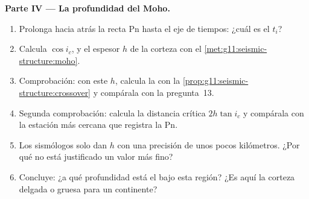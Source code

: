 \begin{problem}
\medskip
\noindent\textbf{Parte IV --- La profundidad del Moho.}
\begin{enumerate}[resume]
  \item Prolonga hacia atrás la recta Pn hasta el eje de tiempos: ¿cuál es el
         $t_i$?
  \item Calcula $\cos i_c$, y el espesor $h$ de la corteza con el
        \cref{met:g11:seismic-structure:moho}.
  \item Comprobación: con este $h$, calcula la  con la
        \cref{prop:g11:seismic-structure:crossover} y compárala con la
        pregunta~13.
  \item Segunda comprobación: calcula la distancia crítica $2h\tan i_c$ y
        compárala con la estación más cercana que registra la Pn.
  \item Los sismólogos solo dan $h$ con una precisión de unos pocos
        kilómetros. ¿Por qué no está justificado un valor más fino?
  \item Concluye: ¿a qué profundidad está el  bajo esta región? ¿Es aquí
        la corteza delgada o gruesa para un continente?
\end{enumerate}
\end{problem}
